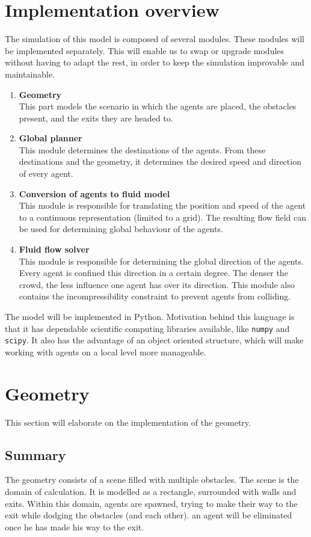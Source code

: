 \documentclass{article}
\begin{document}
\section{Implementation overview}
The simulation of this model is composed of several modules. These modules will be implemented separately. This will enable us to swap or upgrade modules without having to adapt the rest, in order to keep the simulation improvable and maintainable.
\begin{enumerate}
\item \textbf{Geometry}\\
This part models the scenario in which the agents are placed, the obstacles present, and the exits they are headed to.
\item \textbf{Global planner}\\
This module determines the destinations of the agents. From these destinations and the geometry, it determines the desired speed and direction of every agent.
\item \textbf{Conversion of agents to fluid model}\\
This module is responsible for translating the position and speed of the agent to a continuous representation (limited to a grid). The resulting flow field can be used for determining global behaviour of the agents.
\item \textbf{Fluid flow solver}\\
This module is responsible for determining the global direction of the agents. Every agent is confined this direction in a certain degree. The denser the crowd, the less influence one agent has over its direction.
This module also contains the incompressibility constraint to prevent agents from colliding.
\end{enumerate}
The model will be implemented in Python. Motivation behind this language is that it has dependable scientific computing libraries available, like \texttt{numpy} and \texttt{scipy}. It also has the advantage of an object oriented structure, which will make working with agents on a local level more manageable.
\newpage
\section{Geometry}
This section will elaborate on the implementation of the geometry.
\subsection{Summary}
The geometry consists of a scene filled with multiple obstacles. The scene is the domain of calculation. It is modelled as a rectangle, surrounded with walls and exits. Within this domain, agents are spawned, trying to make their way to the exit while dodging the obstacles (and each other). an agent will be eliminated once he has made his way to the exit.
\end{document}

